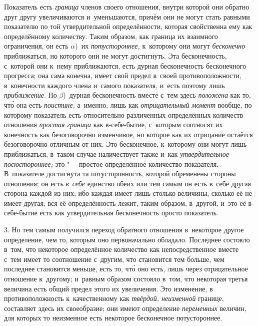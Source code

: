 Показатель есть {\em граница} членов своего отношения, внутри которой они
обратно друг другу увеличиваются и~уменьшаются, причём они не могут стать
равными показателю по той утвердительной определённости, которая свойственна
ему как определённому количеству. Таким образом, как граница их взаимного
ограничения, он есть $\alpha$)~их {\em потустороннее,} к~которому они могут
{\em бесконечно} приближаться, но которого они не могут достигнуть. Эта
бесконечность, с~которой они к~нему приближаются, есть дурная бесконечность
бесконечного прогресса; она сама конечна, имеет свой предел в~своей
противоположности, в~конечности каждого члена и~самого показателя, и~есть
поэтому лишь {\em приближение}. Но $\beta$)~дурная бесконечность вместе
с~тем здесь {\em положена} как то, чт\'{о} она есть {\em поистине,} а~именно,
лишь как {\em отрицательный момент} вообще, по которому показатель есть
относительно различенных определённых количеств отношения {\em простая граница}
как в-себе-бытие, с~которым соотносят их конечность как безоговорочно
изменчивое, но которое как их отрицание остаётся безоговорочно отличным от них.
Это бесконечное, к~которому они могут лишь приближаться, в~таком случае
наличествует также и~как {\em утвердительное посюстороннее;} это "--- простое
определённое количество показателя. В~показателе достигнута та потусторонность,
которой обременены стороны отношения; он есть {\em в~себе} единство обеих или
тем самым он есть в~себе другая сторона каждой из них; ибо каждая имеет лишь
столько величины, сколько её не имеет другая, вся её определённость лежит,
таким образом, в~другой, и~это её в-себе-бытие есть как утвердительная
бесконечность просто показатель.

3. Но тем самым получился переход обратного отношения в~некоторое другое
определение, чем то, которым оно первоначально обладало. Последнее состояло
в~том, что некоторое определённое количество как непосредственное вместе с~тем
имеет то соотношение с~другим, что становится тем больше, чем последнее
становится меньше, есть то, чт\'{о} оно есть, лишь через отрицательное
отношение к~другому; и~равным образом состояло в~том, что некоторая третья
величина есть общий предел этого их увеличения. Это изменение, в
противоположность к~качественному как {\em твёрдой, неизменной} границе,
составляет здесь их своеобразие; они имеют определение {\em переменных}
величин, для которых то неизменное есть некоторое бесконечное потустороннее.

